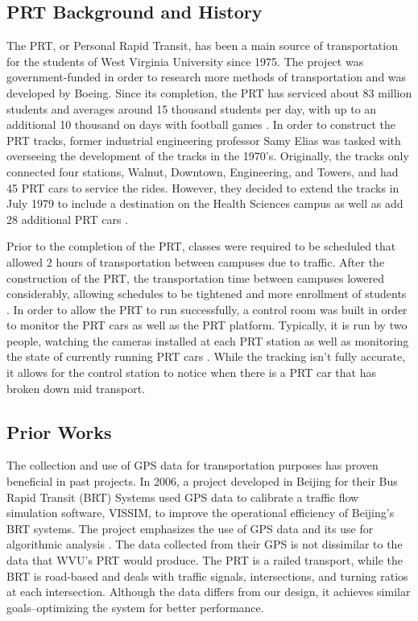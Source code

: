 \subsection{PRT Background and History}
The PRT, or Personal Rapid Transit, has been a main source of transportation for the students of West Virginia University since 1975. The project was government-funded in order to research more methods of transportation and was developed by Boeing. Since its completion, the PRT has serviced about 83 million students and averages around 15 thousand students per day, with up to an additional 10 thousand on days with football games \cite{Booth_2007}. In order to construct the PRT tracks, former industrial engineering professor Samy Elias was tasked with overseeing the development of the tracks in the 1970’s. Originally, the tracks only connected four stations, Walnut, Downtown, Engineering, and Towers, and had 45 PRT cars to service the rides. However, they decided to extend the tracks in July 1979 to include a destination on the Health Sciences campus as well as add 28 additional PRT cars \cite{Booth_2007}. 

Prior to the completion of the PRT, classes were required to be scheduled that allowed 2 hours of transportation between campuses due to traffic. After the construction of the PRT, the transportation time between campuses lowered considerably, allowing schedules to be tightened and more enrollment of students \cite{Trenkner_2011}.  In order to allow the PRT to run successfully, a control room was built in order to monitor the PRT cars as well as the PRT platform. Typically, it is run by two people, watching the cameras installed at each PRT station as well as monitoring the state of currently running PRT cars \cite{Trenkner_2011}. While the tracking isn’t fully accurate, it allows for the control station to notice when there is a PRT car that has broken down mid transport.

\subsection{Prior Works}
The collection and use of GPS data for transportation purposes has proven beneficial in past projects. In 2006, a project developed in Beijing for their Bus Rapid Transit (BRT) Systems used GPS data to calibrate a traffic flow simulation software, VISSIM, to improve the operational efficiency of Beijing’s BRT systems. The project emphasizes the use of GPS data and its use for algorithmic analysis \cite{Yu_Yu_Chen_Wan_Guo_2006}. The data collected from their GPS is not dissimilar to the data that WVU’s PRT would produce. The PRT is a railed transport, while the BRT is road-based and deals with traffic signals, intersections, and turning ratios at each intersection. Although the data differs from our design, it achieves similar goals–optimizing the system for better performance.
	
